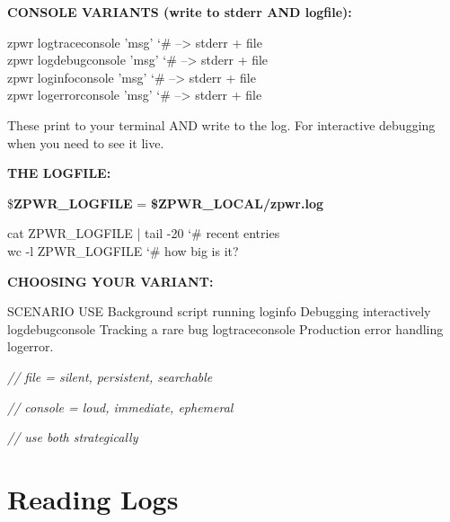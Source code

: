 \documentclass[11pt,a4paper,twoside]{book}
\begin{document}
\vspace{12pt}
{\bfseries\color{neonyellow} CONSOLE VARIANTS (write to stderr AND logfile):}\vspace{4pt}

\begin{codebox}
\color{neongreen}zpwr logtraceconsole 'msg'   {\char`\#} --> stderr + file\\
\color{neongreen}zpwr logdebugconsole 'msg'   {\char`\#} --> stderr + file\\
\color{neongreen}zpwr loginfoconsole 'msg'    {\char`\#} --> stderr + file\\
\color{neongreen}zpwr logerrorconsole 'msg'   {\char`\#} --> stderr + file\\
\end{codebox}

These print to your terminal AND write to the log. For interactive debugging when you need to see it live.


\vspace{12pt}
{\bfseries\color{neonyellow} THE LOGFILE:}\vspace{4pt}

\$\textbf{ZPWR\_LOGFILE} = \textbf{\$ZPWR\_LOCAL/zpwr.log}

\begin{codebox}
\color{neongreen}cat ZPWR\_LOGFILE | tail -20   {\char`\#} recent entries\\
\color{neongreen}wc -l ZPWR\_LOGFILE           {\char`\#} how big is it?\\
\end{codebox}


\vspace{12pt}
{\bfseries\color{neonyellow} CHOOSING YOUR VARIANT:}\vspace{4pt}

SCENARIO                          USE Background script running          loginfo Debugging interactively             logdebugconsole Tracking a rare bug                 logtraceconsole Production error handling           logerror.

{\small\itshape\color{dimtext} // file = silent, persistent, searchable}

{\small\itshape\color{dimtext} // console = loud, immediate, ephemeral}

{\small\itshape\color{dimtext} // use both strategically}


\vspace{16pt}

\section{Reading Logs}
\end{document}
